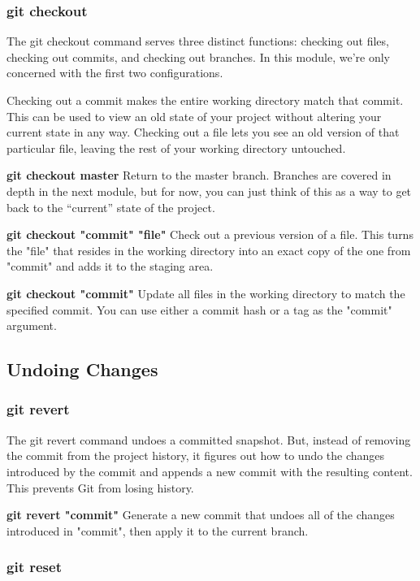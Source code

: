 \documentclass{article}
\begin{document}
\subsubsection{git checkout}

The git checkout command serves three distinct functions: checking out files, checking out commits, and checking out branches. In this module, we’re only concerned with the first two configurations.

Checking out a commit makes the entire working directory match that commit. This can be used to view an old state of your project without altering your current state in any way. Checking out a file lets you see an old version of that particular file, leaving the rest of your working directory untouched.


\textbf{git checkout master}
	Return to the master branch. Branches are covered in depth in the next module, but for now, you can just think of this as a way to get back to the “current” state of the project.

\textbf{git checkout "commit" "file"}
Check out a previous version of a file. This turns the "file" that resides in the working directory into an exact copy of the one from "commit" and adds it to the staging area.

\textbf{git checkout "commit"}
Update all files in the working directory to match the specified commit. You can use either a commit hash or a tag as the "commit" argument.

\subsection{Undoing Changes}
\subsubsection{git revert}

The git revert command undoes a committed snapshot. But, instead of removing the commit from the project history, it figures out how to undo the changes introduced by the commit and appends a new commit with the resulting content. This prevents Git from losing history.

\textbf{git revert "commit"}
Generate a new commit that undoes all of the changes introduced in "commit", then apply it to the current branch.

\subsubsection{git reset}
\end{document}
